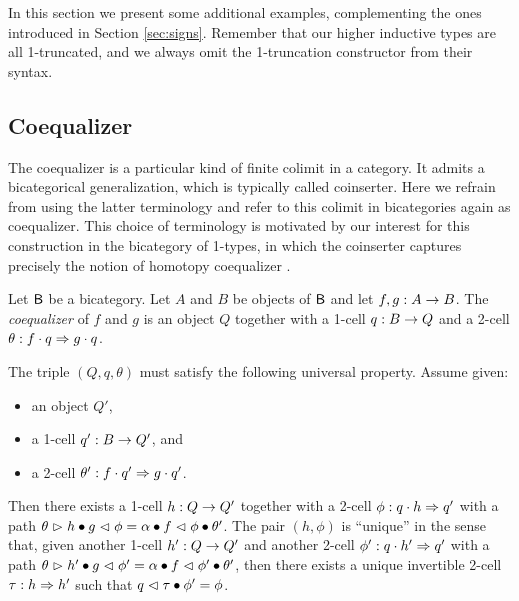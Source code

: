 In this section we present some additional examples, complementing the
ones introduced in Section \ref{sec:signs}. Remember that our higher
inductive types are all 1-truncated, and we always omit the 1-truncation
constructor from their syntax.

\subsection{Coequalizer}
\label{sec:coequalizer}

The coequalizer is a particular kind of finite colimit in a
category. It admits a bicategorical generalization, which is typically
called coinserter. Here we refrain from using the latter terminology
and refer to this colimit in bicategories again as coequalizer. This
choice of terminology is motivated by our interest for this
construction in the bicategory of 1-types, in which the coinserter
captures precisely the notion of homotopy coequalizer \cite[Chapter 6]{hottbook}.

\begin{definition}
Let $\B$ be a bicategory. Let $A$ and $B$ be objects of $\B$ and let
$f,g : A \onecell B$. The \emph{coequalizer} of $f$ and $g$ is an
object $Q$ together with a 1-cell $q : B \onecell Q$ and a 2-cell
$\theta : f \cdot q\twocell g \cdot q$.

The triple $(Q,q,\theta)$ must satisfy the following universal
property. Assume given:
\begin{itemize}
\item an object $Q'$,
\item a 1-cell $q' : B \onecell Q'$, and
\item a 2-cell $\theta' : f \cdot q' \twocell g \cdot q'$.
\end{itemize}
Then there exists a 1-cell $h : Q \onecell Q'$ together with a 2-cell
$\phi : q \cdot h \twocell q'$ with a path $\theta \whiskerr h \vcomp
g \whiskerl \phi = \lassoc{f}{q}{h} \vcomp f \whiskerl \phi \vcomp
\theta'$. The pair $(h,\phi)$ is ``unique'' in the sense that,
given another 1-cell $h' : Q \onecell Q'$ and another 2-cell $\phi' :
q \cdot h' \twocell q'$ with a path $\theta \whiskerr h' \vcomp g
\whiskerl \phi' = \lassoc{f}{q}{h'} \vcomp f \whiskerl \phi' \vcomp
\theta'$, then there exists a unique invertible 2-cell $\tau : h
\twocell h'$ such that $q \whiskerl \tau \vcomp \phi' = \phi$.
\end{definition}

